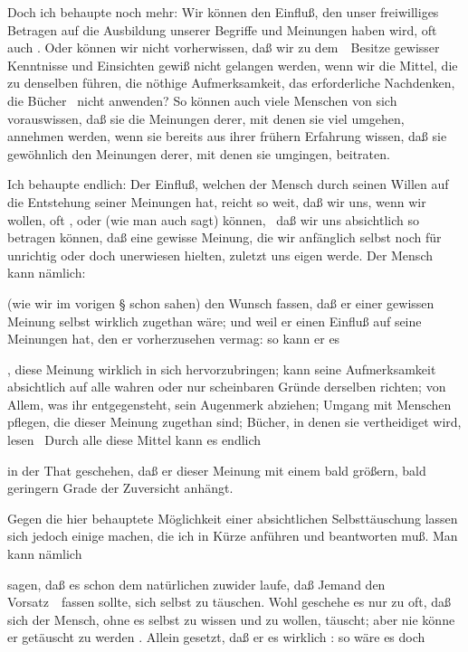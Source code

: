 \begin{aufza}
\begin{aufzb}
\end{aufzb}
\item Doch ich behaupte noch mehr: Wir können den Einfluß, den unser freiwilliges Betragen auf die Ausbildung unserer Begriffe und Meinungen haben wird, oft auch . Oder können wir nicht vorherwissen, daß wir zu dem~\ Besitze gewisser Kenntnisse und Einsichten gewiß nicht gelangen werden, wenn wir die Mittel, die zu denselben führen, die nöthige Aufmerksamkeit, das erforderliche Nachdenken, die Bücher \udgl\ nicht anwenden? So können auch viele Menschen von sich vorauswissen, daß sie die Meinungen derer, mit denen sie viel umgehen, annehmen werden, wenn sie bereits aus ihrer frühern Erfahrung wissen, daß sie gewöhnlich den Meinungen derer, mit denen sie umgingen, beitraten.
\item Ich behaupte endlich: Der Einfluß, welchen der Mensch durch seinen Willen auf die Entstehung seiner Meinungen hat, reicht so weit, daß wir uns, wenn wir wollen, oft , oder (wie man auch sagt)  können, \dh\ daß wir uns absichtlich so betragen können, daß eine gewisse Meinung, die wir anfänglich selbst noch für unrichtig oder doch unerwiesen hielten, zuletzt uns eigen werde. Der Mensch kann nämlich:
\begin{aufzb}
\item (wie wir im vorigen § schon sahen) den Wunsch fassen, daß er einer gewissen Meinung selbst wirklich zugethan wäre; und weil er einen Einfluß auf seine Meinungen hat, den er vorherzusehen vermag: so kann er es
\item {}, diese Meinung wirklich in sich hervorzubringen; kann seine Aufmerksamkeit absichtlich auf alle wahren oder nur scheinbaren Gründe derselben richten; von Allem, was ihr entgegensteht, sein Augenmerk abziehen; Umgang mit Menschen pflegen, die dieser Meinung zugethan sind; Bücher, in denen sie vertheidiget wird, lesen \usw\ Durch alle diese Mittel kann es endlich
\item in der That geschehen, daß er dieser Meinung mit einem bald größern, bald geringern Grade der Zuversicht anhängt.
\end{aufzb}
\item Gegen die hier behauptete Möglichkeit einer absichtlichen Selbsttäuschung lassen sich jedoch einige  machen, die ich in Kürze anführen und beantworten muß. Man kann nämlich
\begin{aufzb}
\item sagen, daß es schon dem natürlichen  zuwider laufe, daß Jemand den Vorsatz~\ fassen sollte, sich selbst zu täuschen. Wohl geschehe es nur zu oft, daß sich der Mensch, ohne es selbst zu wissen und zu wollen, täuscht; aber nie könne er getäuscht zu werden . Allein gesetzt, daß er es wirklich : so wäre es doch

\end{aufzb}
\end{aufza}
